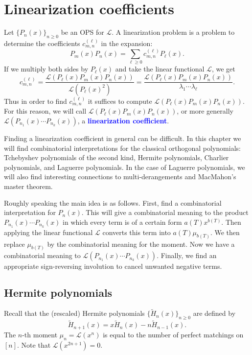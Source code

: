 \documentclass[oneside]{book}
\numberwithin{equation}{section}
\theoremstyle{definition}
\newcommand\LL{\mathcal{L}}
\renewcommand\emph[1]{\textcolor{blue}{\bf #1}}
\begin{document}
\chapter{Linearization coefficients}



Let \( \{ P_n(x) \}_{n\ge 0} \) be an OPS for \( \LL \). A
linearization problem is a problem to determine the coefficients
\( c_{m,n}^{(\ell)} \) in the expansion:
\[
  P_m(x)P_n(x) = \sum_{\ell\ge0} c_{m,n}^{(\ell)} P_\ell(x).
\]
If we multiply both sides by \( P_\ell(x) \) and take the linear
functional \( \LL \), we get
\[
  c_{m,n}^{(\ell)} = \frac{\LL(P_\ell(x)P_m(x)P_n(x))}{\LL(P_\ell(x)^2)}
  = \frac{\LL(P_\ell(x)P_m(x)P_n(x))}{\lambda_1 \cdots \lambda_\ell}.
\]
Thus in order to find \( c_{m,n}^{(\ell)} \) it suffices to compute
\( \LL(P_\ell(x)P_m(x)P_n(x)) \). For this reason, we will call
\( \LL(P_\ell(x)P_m(x)P_n(x)) \), or more generally
\( \LL(P_{n_1}(x)\cdots P_{n_k}(x)) \), a \emph{linearization
  coefficient}.

Finding a linearization coefficient in general can be difficult. In
this chapter we will find combinatorial interpretations for the
classical orthogonal polynomials: Tchebyshev polynomials of the second
kind, Hermite polynomials, Charlier polynomials, and Laguerre
polynomials. In the case of Laguerre polynomials, we will also find
interesting connections to multi-derangements and MacMahon's master
theorem.

Roughly speaking the main idea is as follows. First, find a
combinatorial interpretation for \( P_n(x) \). This will give a
combinatorial meaning to the product \( P_{n_1}(x)\cdots P_{n_k}(x) \)
in which every term is of a certain form \( a(T)x^{b(T)} \). Then
applying the linear functional \( \LL \) converts this term into
\( a(T)\mu_{b(T)} \). We then replace \( \mu_{b(T)} \) by the
combinatorial meaning for the moment. Now we have a combinatorial
meaning to \( \LL(P_{n_1}(x)\cdots P_{n_k}(x)) \). Finally, we find an
appropriate sign-reversing involution to cancel unwanted negative
terms.


\section{Hermite polynomials}

Recall that the (rescaled) Hermite polynomials
\( \{ \widetilde{H}_n(x) \}_{n\ge 0} \) are defined by
\[
  \widetilde{H}_{n+1}(x) = x \widetilde{H}_n(x) - n \widetilde{H}_{n-1}(x).
\]
The \( n \)-th moment \( \mu_{n}= \LL(x^n) \) is equal to the number
of perfect matchings on \( [n] \). Note that \( \LL(x^{2n+1}) = 0 \).
\end{document}
